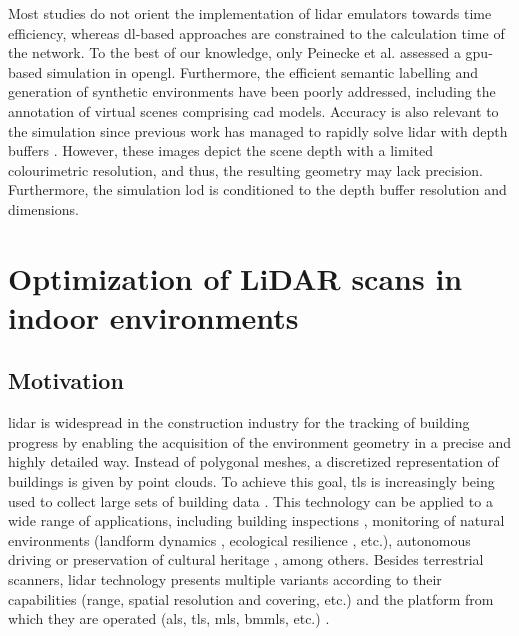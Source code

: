 Most studies do not orient the implementation of \acrshort{lidar} emulators towards time efficiency, whereas \acrshort{dl}-based approaches are constrained to the calculation time of the network. To the best of our knowledge, only Peinecke et al. \cite{peinecke_lidar_2008} assessed a \acrshort{gpu}-based simulation in \acrshort{opengl}. Furthermore, the efficient semantic labelling and generation of synthetic environments have been poorly addressed, including the annotation of virtual scenes comprising \acrshort{cad} models. Accuracy is also relevant to the simulation since previous work has managed to rapidly solve \acrshort{lidar} with depth buffers \cite{su_simulation_2019, fang_augmented_2020, manivasagam_lidarsim_2020}. However, these images depict the scene depth with a limited colourimetric resolution, and thus, the resulting geometry may lack precision. Furthermore, the simulation \acrshort{lod} is conditioned to the depth buffer resolution and dimensions.

\section{Optimization of LiDAR scans in indoor environments}

\subsection{Motivation} 

\acrshort{lidar} is widespread in the construction industry for the tracking of building progress by enabling the acquisition of the environment geometry in a precise and highly detailed way. Instead of polygonal meshes, a discretized representation of buildings is given by point clouds. To achieve this goal, \acrshort{tls} is increasingly being used to collect large sets of building data \cite{pandzic_error_2017}. This technology can be applied to a wide range of applications, including building inspections \cite{shariq_revolutionising_2020}, monitoring of natural environments (landform dynamics \cite{guisado-pintado_3d_2019}, ecological resilience \cite{mitasova_geospatial_2010}, etc.), autonomous driving \cite{kuutti_survey_2021} or preservation of cultural heritage \cite{banfi_integration_2019, ham_phased_2020, andriasyan_point_2020}, among others. Besides terrestrial scanners, \acrshort{lidar} technology presents multiple variants according to their capabilities (range, spatial resolution and covering, etc.) and the platform from which they are operated (\acrshort{als}, \acrshort{tls}, \acrshort{mls}, \acrshort{bmmls}, etc.) \cite{poux_smart_2019, warchol_concept_2019}. 

